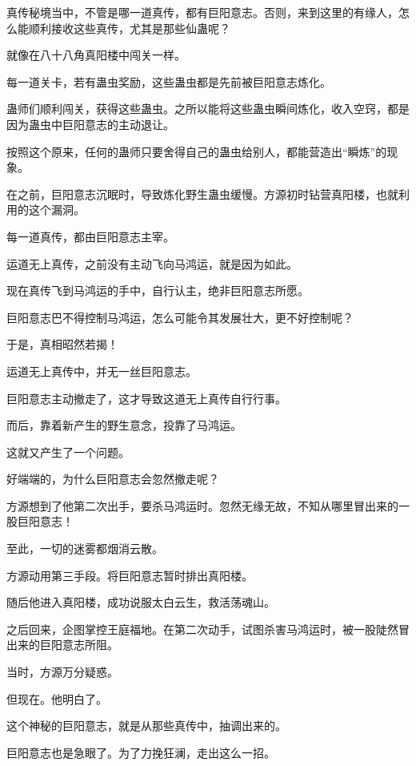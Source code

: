 
\begin{this_body}

真传秘境当中，不管是哪一道真传，都有巨阳意志。否则，来到这里的有缘人，怎么能顺利接收这些真传，尤其是那些仙蛊呢？

就像在八十八角真阳楼中闯关一样。

每一道关卡，若有蛊虫奖励，这些蛊虫都是先前被巨阳意志炼化。

蛊师们顺利闯关，获得这些蛊虫。之所以能将这些蛊虫瞬间炼化，收入空窍，都是因为蛊虫中巨阳意志的主动退让。

按照这个原来，任何的蛊师只要舍得自己的蛊虫给别人，都能营造出“瞬炼”的现象。

在之前，巨阳意志沉眠时，导致炼化野生蛊虫缓慢。方源初时钻营真阳楼，也就利用的这个漏洞。

每一道真传，都由巨阳意志主宰。

运道无上真传，之前没有主动飞向马鸿运，就是因为如此。

现在真传飞到马鸿运的手中，自行认主，绝非巨阳意志所愿。

巨阳意志巴不得控制马鸿运，怎么可能令其发展壮大，更不好控制呢？

于是，真相昭然若揭！

运道无上真传中，并无一丝巨阳意志。

巨阳意志主动撤走了，这才导致这道无上真传自行行事。

而后，靠着新产生的野生意念，投靠了马鸿运。

这就又产生了一个问题。

好端端的，为什么巨阳意志会忽然撤走呢？

方源想到了他第二次出手，要杀马鸿运时。忽然无缘无故，不知从哪里冒出来的一股巨阳意志！

至此，一切的迷雾都烟消云散。

方源动用第三手段。将巨阳意志暂时排出真阳楼。

随后他进入真阳楼，成功说服太白云生，救活荡魂山。

之后回来，企图掌控王庭福地。在第二次动手，试图杀害马鸿运时，被一股陡然冒出来的巨阳意志所阻。

当时，方源万分疑惑。

但现在。他明白了。

这个神秘的巨阳意志，就是从那些真传中，抽调出来的。

巨阳意志也是急眼了。为了力挽狂澜，走出这么一招。


\end{this_body}
